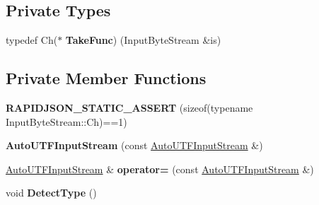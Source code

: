 \subsection*{Private Types}
\begin{DoxyCompactItemize}
\item 
typedef Ch($\ast$ {\bfseries Take\+Func}) (Input\+Byte\+Stream \&is)\hypertarget{class_auto_u_t_f_input_stream_a106a0af4b098cc88e1dba285b8f563ae}{}\label{class_auto_u_t_f_input_stream_a106a0af4b098cc88e1dba285b8f563ae}

\end{DoxyCompactItemize}
\subsection*{Private Member Functions}
\begin{DoxyCompactItemize}
\item 
{\bfseries R\+A\+P\+I\+D\+J\+S\+O\+N\+\_\+\+S\+T\+A\+T\+I\+C\+\_\+\+A\+S\+S\+E\+RT} (sizeof(typename Input\+Byte\+Stream\+::\+Ch)==1)\hypertarget{class_auto_u_t_f_input_stream_a74f5efc9cfc9e9978d81a3282abf17da}{}\label{class_auto_u_t_f_input_stream_a74f5efc9cfc9e9978d81a3282abf17da}

\item 
{\bfseries Auto\+U\+T\+F\+Input\+Stream} (const \hyperlink{class_auto_u_t_f_input_stream}{Auto\+U\+T\+F\+Input\+Stream} \&)\hypertarget{class_auto_u_t_f_input_stream_a54001615e50304edf4a4ac1b2931f5d7}{}\label{class_auto_u_t_f_input_stream_a54001615e50304edf4a4ac1b2931f5d7}

\item 
\hyperlink{class_auto_u_t_f_input_stream}{Auto\+U\+T\+F\+Input\+Stream} \& {\bfseries operator=} (const \hyperlink{class_auto_u_t_f_input_stream}{Auto\+U\+T\+F\+Input\+Stream} \&)\hypertarget{class_auto_u_t_f_input_stream_a043b85d05491e8908611054b37aec38b}{}\label{class_auto_u_t_f_input_stream_a043b85d05491e8908611054b37aec38b}

\item 
void {\bfseries Detect\+Type} ()\hypertarget{class_auto_u_t_f_input_stream_ae7ec4841acf560cdaee9204d6ad5dec8}{}\label{class_auto_u_t_f_input_stream_ae7ec4841acf560cdaee9204d6ad5dec8}

\end{DoxyCompactItemize}

